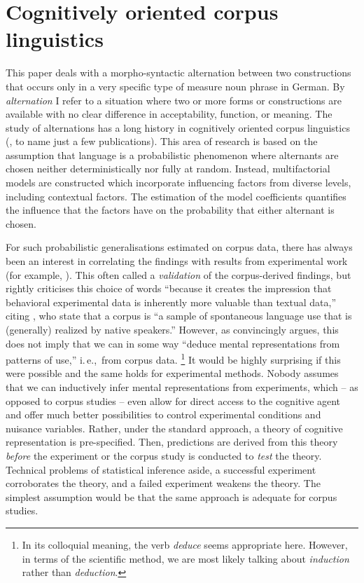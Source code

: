 \documentclass[USenglish]{article}
\newcommand{\ie}{i.\,e.,}
\begin{document}
\section{Cognitively oriented corpus linguistics}
\label{sec:cogocl}

This paper deals with a morpho-syntactic alternation between two constructions that occurs only in a very specific type of measure noun phrase in German.
By \textit{alternation} I refer to a situation where two or more forms or constructions are available with no clear difference in acceptability, function, or meaning.
The study of alternations has a long history in cognitively oriented corpus linguistics (\citealp{BresnanEa2007,BresnanHay2010,BresnanFord2010,DivjakArppe2013,Gries2015,NessetJanda2010}, to name just a few publications).
This area of research is based on the assumption that language is a probabilistic phenomenon \citep{Bresnan2007} where alternants are chosen neither deterministically nor fully at random.
Instead, multifactorial models are constructed which incorporate influencing factors from diverse levels, including contextual factors.
The estimation of the model coefficients quantifies the influence that the factors have on the probability that either alternant is chosen.

For such probabilistic generalisations estimated on corpus data, there has always been an interest in correlating the findings with results from experimental work (for example, \citealp{ArppeJaervikivi2007,BresnanEa2007,BresnanFord2010,DivjakGries2008,DivjakEa2016,FordBresnan2013}).
This often called a \textit{validation} of the corpus-derived findings, but \citet[303]{Divjak2016a} rightly criticises this choice of words ``because it creates the impression that behavioral experimental data is inherently more valuable than textual data,'' citing \cite{TummersEa2005}, who state that a corpus is ``a sample of spontaneous language use that is (generally) realized by native speakers.''
However, as \citet[486--487]{Dabrowska2016} convincingly argues, this does not imply that we can in some way ``deduce mental representations from patterns of use,'' \ie\ from corpus data.%
\footnote{In its colloquial meaning, the verb \textit{deduce} seems appropriate here.
However, in terms of the scientific method, we are most likely talking about \textit{induction} rather than \textit{deduction}.}
It would be highly surprising if this were possible and the same holds for experimental methods.
Nobody assumes that we can inductively infer mental representations from experiments, which -- as opposed to corpus studies -- even allow for direct access to the cognitive agent and offer much better possibilities to control experimental conditions and nuisance variables.
Rather, under the standard approach, a theory of cognitive representation is pre-specified.
Then, predictions are derived from this theory \textit{before} the experiment or the corpus study is conducted to \textit{test} the theory.
Technical problems of statistical inference aside, a successful experiment corroborates the theory, and a failed experiment weakens the theory.
The simplest assumption would be that the same approach is adequate for corpus studies.
\end{document}
